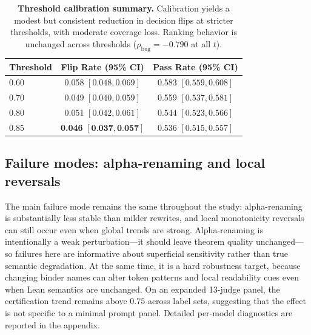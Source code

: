 \documentclass{article}
\begin{document}
\begin{table}[t]
  \centering
  \small
  \begin{tabular}{lcc}
    \toprule
    \textbf{Threshold} & \textbf{Flip Rate (95\% CI)}                        & \textbf{Pass Rate (95\% CI)} \\
    \midrule
    0.60               & 0.058 \([0.048, 0.069]\)                            & 0.583 \([0.559, 0.608]\)     \\
    0.70               & 0.049 \([0.040, 0.059]\)                            & 0.559 \([0.537, 0.581]\)     \\
    0.80               & 0.051 \([0.042, 0.061]\)                            & 0.544 \([0.523, 0.566]\)     \\
    0.85               & \textbf{0.046} \([\textbf{0.037}, \textbf{0.057}]\) & 0.536 \([0.515, 0.557]\)     \\
    \bottomrule
  \end{tabular}
  \caption{\textbf{Threshold calibration summary.}
    Calibration yields a modest but consistent reduction in decision flips at stricter thresholds, with moderate coverage loss.
    Ranking behavior is unchanged across thresholds (\(\rho_{\text{bug}}=-0.790\) at all \(t\)).}
  \label{tab:exp13_threshold_sweep}
\end{table}

\subsection{Failure modes: alpha-renaming and local reversals}
The main failure mode remains the same throughout the study: alpha-renaming is substantially less stable than milder rewrites, and local monotonicity reversals can still occur even when global trends are strong. Alpha-renaming is intentionally a weak perturbation---it should leave theorem quality unchanged---so failures here are informative about superficial sensitivity rather than true semantic degradation. At the same time, it is a hard robustness target, because changing binder names can alter token patterns and local readability cues even when Lean semantics are unchanged. On an expanded 13-judge panel, the certification trend remains above \(0.75\) across label sets, suggesting that the effect is not specific to a minimal prompt panel. Detailed per-model diagnostics are reported in the appendix.
\end{document}
